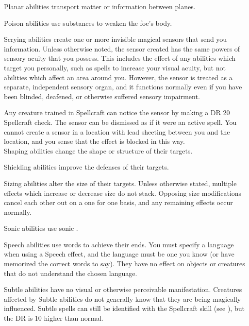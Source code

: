      Planar abilities transport matter or information between planes.

     Poison abilities use substances to weaken the foe's body.

     Scrying abilities create one or more invisible magical sensors that send you information.
    Unless otherwise noted, the sensor created has the same powers of sensory acuity that you possess.
    This includes the effect of any abilities which target you personally, such as spells to increase your visual acuity, but not abilities which affect an area around you.
    However, the sensor is treated as a separate, independent sensory organ, and it functions normally even if you have been blinded, deafened, or otherwise suffered sensory impairment.
    \par Any creature trained in Spellcraft can notice the sensor by making a DR 20 Spellcraft check.
    The sensor can be dismissed as if it were an active spell.
    You cannot create a sensor in a location with lead sheeting between you and the location, and you sense that the effect is blocked in this way.
    \\

     Shaping abilities change the shape or structure of their targets.

     Shielding abilities improve the defenses of their targets.

     Sizing abilities alter the size of their targets.
    Unless otherwise stated, multiple effects which increase or decrease size do not stack.
    Opposing size modifications cancel each other out on a one for one basis, and any remaining effects occur normally.

     Sonic abilities use sonic .

     Speech abilities use words to achieve their ends.
    You must specify a language when using a Speech effect, and the language must be one you know (or have memorized the correct words to say). They have no effect on objects or creatures that do not understand the chosen language.

     Subtle abilities have no visual or otherwise perceivable manifestation.
    Creatures affected by Subtle abilities do not generally know that they are being magically influenced.
    Subtle spells can still be identified with the Spellcraft skill (see ), but the DR is 10 higher than normal.

